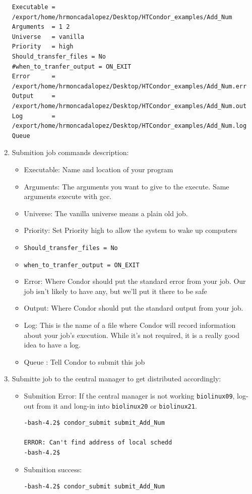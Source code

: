 \documentclass{article}
\begin{document}
\begin{enumerate}
\begin{verbatim}
Executable = /export/home/hrmoncadalopez/Desktop/HTCondor_examples/Add_Num
Arguments  = 1 2
Universe   = vanilla
Priority   = high
Should_transfer_files = No
#when_to_tranfer_output = ON_EXIT
Error      = /export/home/hrmoncadalopez/Desktop/HTCondor_examples/Add_Num.err
Output     = /export/home/hrmoncadalopez/Desktop/HTCondor_examples/Add_Num.out
Log        = /export/home/hrmoncadalopez/Desktop/HTCondor_examples/Add_Num.log
Queue
\end{verbatim}
\normalsize
\item  Submition job commands description:
\begin{itemize}
\item Executable: Name and location of your program
\item Arguments: The arguments you want to give to the execute. Same arguments execute with gcc.
\item Universe: The vanilla universe means a plain old job.
\item Priority: Set Priority high to allow the system to wake up computers
\item \verb+Should_transfer_files = No+
\item \verb+when_to_tranfer_output = ON_EXIT+
\item Error: Where Condor should put the standard error from your job. Our job isn't likely to have any, but we'll put it there to be safe
\item Output: Where Condor should put the standard output from your job.
\item Log: This is the name of a file where Condor will record information about your job's execution. While it's not required, it is a really good idea to have a log.
\item Queue : Tell Condor to submit this job
\end{itemize}
\item Submitte job to the central manager to get distributed accordingly:
\begin{itemize}
\item Submition Error:  If the central manager is not working \verb+biolinux09+, log-out from it and long-in into \verb+biolinux20+  or  \verb+biolinux21+. 
\scriptsize\begin{verbatim}
-bash-4.2$ condor_submit submit_Add_Num 

ERROR: Can't find address of local schedd
-bash-4.2$ 
\end{verbatim}
\normalsize
\item Submition success:
\scriptsize\begin{verbatim}
-bash-4.2$ condor_submit submit_Add_Num 


\end{verbatim}
\end{itemize}
\end{enumerate}
\end{document}
